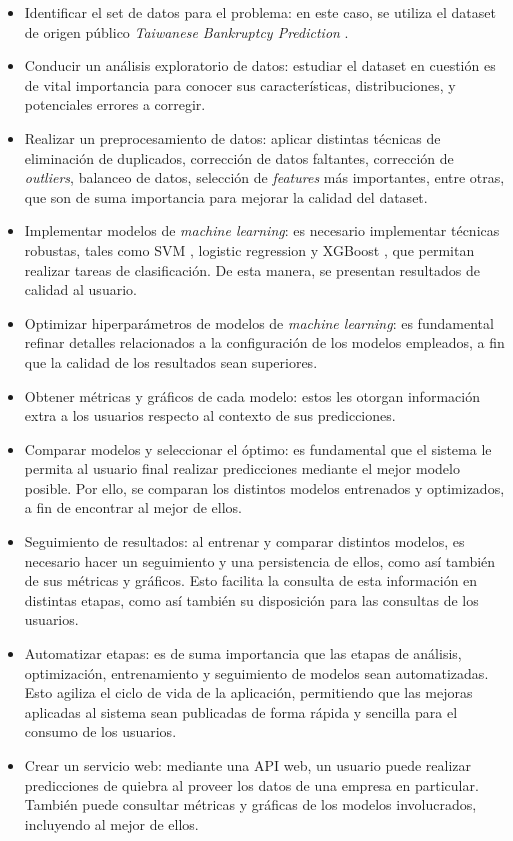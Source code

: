 \begin{itemize}
    \item Identificar el set de datos para el problema: en este caso, se utiliza el dataset de origen público \textit{Taiwanese Bankruptcy Prediction} \citep{taiwanese_bankruptcy_prediction_572}.
    \item Conducir un análisis exploratorio de datos: estudiar el dataset en cuestión es de vital importancia para conocer sus características, distribuciones, y potenciales errores a corregir.
    \item Realizar un preprocesamiento de datos: aplicar distintas técnicas de eliminación de duplicados, corrección de datos faltantes, corrección de \textit{outliers}, balanceo de datos, selección de \textit{features} más importantes, entre otras, que son de suma importancia para mejorar la calidad del dataset.
    \item Implementar modelos de \textit{machine learning}: es necesario implementar técnicas robustas, tales como SVM \citep{model:svm}, logistic regression \citep{model:lr} y XGBoost \citep{model:xgboost}, que permitan realizar tareas de clasificación. De esta manera, se presentan resultados de calidad al usuario.
    \item Optimizar hiperparámetros de modelos de \textit{machine learning}: es fundamental refinar detalles relacionados a la configuración de los modelos empleados, a fin que la calidad de los resultados sean superiores.
    \item Obtener métricas y gráficos de cada modelo: estos les otorgan información extra a los usuarios respecto al contexto de sus predicciones.
    \item Comparar modelos y seleccionar el óptimo: es fundamental que el sistema le permita al usuario final realizar predicciones mediante el mejor modelo posible. Por ello, se comparan los distintos modelos entrenados y optimizados, a fin de encontrar al mejor de ellos.
    \item Seguimiento de resultados: al entrenar y comparar distintos modelos, es necesario hacer un seguimiento y una persistencia de ellos, como así también de sus métricas y gráficos. Esto facilita la consulta de esta información en distintas etapas, como así también su disposición para las consultas de los usuarios.
    \item Automatizar etapas: es de suma importancia que las etapas de análisis, optimización, entrenamiento y seguimiento de modelos sean automatizadas. Esto agiliza el ciclo de vida de la aplicación, permitiendo que las mejoras aplicadas al sistema sean publicadas de forma rápida y sencilla para el consumo de los usuarios.
    \item Crear un servicio web: mediante una API web, un usuario puede realizar predicciones de quiebra al proveer los datos de una empresa en particular. También puede consultar métricas y gráficas de los modelos involucrados, incluyendo al mejor de ellos.
\end{itemize}

